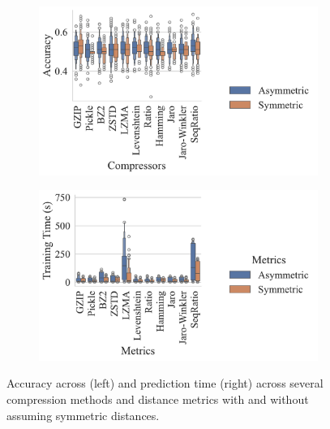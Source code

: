 \begin{figure}
    \begin{subfigure}
        \centering
        \includegraphics[width=.36\textwidth]{figs/truthseeker/symmetric_vs_metric.pdf}
    \end{subfigure}
    \begin{subfigure}
        \centering
        \includegraphics[width=.36\textwidth]{figs/truthseeker/symmetric_vs_metric_train_time.pdf}
    \end{subfigure}
    \caption{Accuracy across (left) and prediction time (right) across several compression methods and distance metrics with and without assuming symmetric distances.}
    \label{fig:symmetry}
\end{figure}
